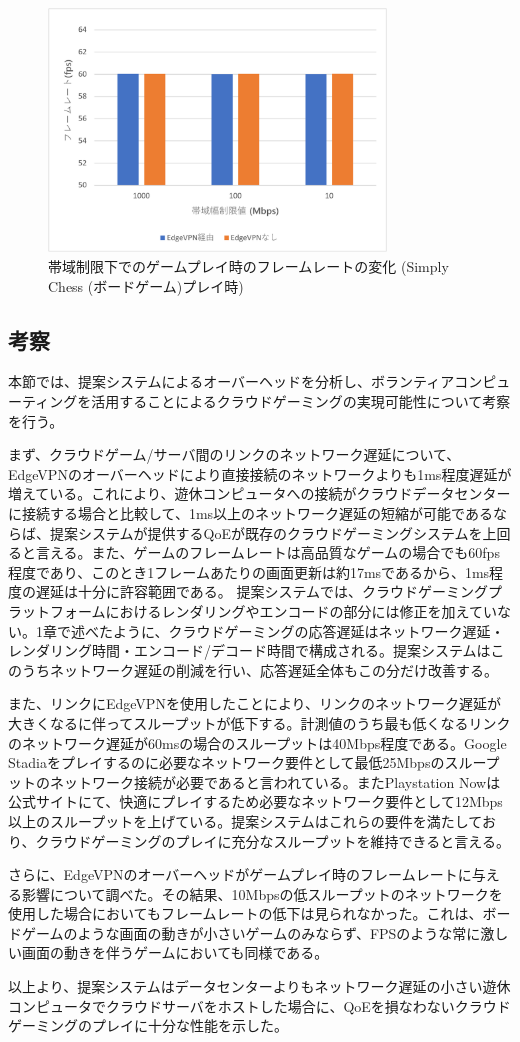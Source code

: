 \begin{figure}[h!]
    \centering
    \includegraphics[width=0.8\textwidth,keepaspectratio,clip]{img/framerate_Board.pdf}
    \caption{帯域制限下でのゲームプレイ時のフレームレートの変化 (Simply Chess (ボードゲーム)プレイ時)}
    \label{fig:fps_board}
\end{figure}

\subsection{考察}
本節では、提案システムによるオーバーヘッドを分析し、ボランティアコンピューティングを活用することによるクラウドゲーミングの実現可能性について考察を行う。

まず、クラウドゲーム/サーバ間のリンクのネットワーク遅延について、EdgeVPNのオーバーヘッドにより直接接続のネットワークよりも1ms程度遅延が増えている。これにより、遊休コンピュータへの接続がクラウドデータセンターに接続する場合と比較して、1ms以上のネットワーク遅延の短縮が可能であるならば、提案システムが提供するQoEが既存のクラウドゲーミングシステムを上回ると言える。また、ゲームのフレームレートは高品質なゲームの場合でも60fps程度であり、このとき1フレームあたりの画面更新は約17msであるから、1ms程度の遅延は十分に許容範囲である。
提案システムでは、クラウドゲーミングプラットフォームにおけるレンダリングやエンコードの部分には修正を加えていない。1章で述べたように、クラウドゲーミングの応答遅延はネットワーク遅延・レンダリング時間・エンコード/デコード時間で構成される。提案システムはこのうちネットワーク遅延の削減を行い、応答遅延全体もこの分だけ改善する。

また、リンクにEdgeVPNを使用したことにより、リンクのネットワーク遅延が大きくなるに伴ってスループットが低下する。計測値のうち最も低くなるリンクのネットワーク遅延が60msの場合のスループットは40Mbps程度である。Google Stadiaをプレイするのに必要なネットワーク要件として最低25Mbpsのスループットのネットワーク接続が必要であると言われている\cite{stadia_band}。またPlaystation Nowは公式サイトにて、快適にプレイするため必要なネットワーク要件として12Mbps以上のスループットを上げている\cite{ps-now}。提案システムはこれらの要件を満たしており、クラウドゲーミングのプレイに充分なスループットを維持できると言える。

さらに、EdgeVPNのオーバーヘッドがゲームプレイ時のフレームレートに与える影響について調べた。その結果、10Mbpsの低スループットのネットワークを使用した場合においてもフレームレートの低下は見られなかった。これは、ボードゲームのような画面の動きが小さいゲームのみならず、FPSのような常に激しい画面の動きを伴うゲームにおいても同様である。

以上より、提案システムはデータセンターよりもネットワーク遅延の小さい遊休コンピュータでクラウドサーバをホストした場合に、QoEを損なわないクラウドゲーミングのプレイに十分な性能を示した。



